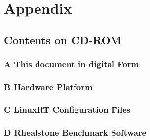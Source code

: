 \appendix
{}

\chapter*{Appendix}
\section*{  \space Contents on CD-ROM}
\subsection*{A  \space This document in digital Form}
\subsection*{B  \space Hardware Platform}
\subsection*{C  \space LinuxRT Configuration Files}
\subsection*{D  \space Rhealstone Benchmark Software}
